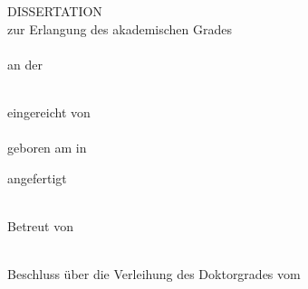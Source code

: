 \begin{titlepage}
\begin{center}

\null
\vspace{\baselineskip}
{\huge {\bfseries \tTitle \par}}
\vspace{5\baselineskip}
{\large DISSERTATION} \\
\vspace{\baselineskip}
zur Erlangung des akademischen Grades \\
\vspace{\baselineskip}
{\large \tDegree} \\
\vspace{\baselineskip}
an der\\ \vspace{.2\baselineskip}{\large Medizinischen Fakultät der Universität Leipzig} \\
\vspace{6\baselineskip}

\vfill

    \noindent
    eingereicht von \\
    \vspace{.5\baselineskip}
    {\bf \tAuthor} \\
    \vspace{.25\baselineskip}
    geboren am \tBirthday{} in \tNativeTown \\

\vspace{5\baselineskip}

    \noindent
    angefertigt \InOderAm{\tDepartment} \\
    \tDepartment \\

\vspace{1.5\baselineskip}

    \noindent
    Betreut von \\
    \vspace{.3\baselineskip}
    \tSupervisor \\

\vspace{1.5\baselineskip}

    \noindent
    Beschluss über die Verleihung des Doktorgrades vom \tDefenceDate

\end{center}
\restoregeometry
\end{titlepage}

